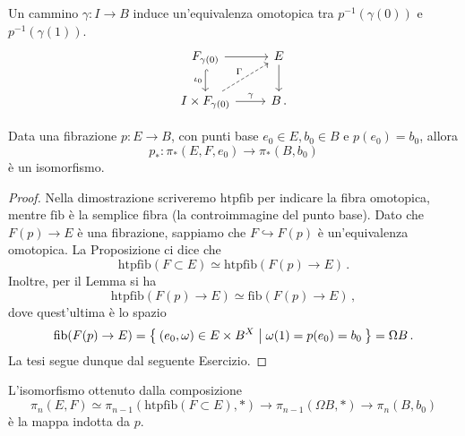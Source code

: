 \begin{exercise}
	Un cammino $\gamma : I \to B$ induce un'equivalenza omotopica
	tra $p^{-1}(\gamma(0))$ e $p^{-1}(\gamma(1))$.
	\begin{equation*}
		\begin{tikzcd}
			F_{\gamma(0)} \ar[r] \ar[d, "\iota_{0}"', hook] 
			& E \ar[d] \\
			I \times F_{\gamma(0)} \ar[r, "\gamma"] \ar[ur, "\Gamma", dashed]
			& B\,.
		\end{tikzcd}
	\end{equation*}
\end{exercise}

\begin{lemma}
	Data una fibrazione $p:E \to B$, con punti base
	$e_{0} \in E, b_{0} \in B$ e $p(e_{0}) = b_{0}$,
	allora
	\begin{equation*}
		p_{*} : \pi_{*}(E,F,e_{0}) \longrightarrow \pi_{*}(B,b_{0})
	\end{equation*}
	è un isomorfismo.
	\begin{proof}
		Nella dimostrazione scriveremo $\mathrm{htpfib}$ per indicare la fibra omotopica,
		mentre $\mathrm{fib}$ è la semplice fibra (la controimmagine del punto base).
		Dato che $F(p) \to E$ è una fibrazione,
		sappiamo che $F \hookrightarrow F(p)$
		è un'equivalenza omotopica.
		La Proposizione ci dice che
		\begin{equation*}
			\mathrm{htpfib}(F \subset E) \simeq \mathrm{htpfib}(F(p) \to E)\,.
		\end{equation*}
		Inoltre, per il Lemma si ha
		\begin{equation*}
			\mathrm{htpfib}(F(p) \to E) \simeq \mathrm{fib}(F(p) \to E)\,,
		\end{equation*}
		dove quest'ultima è lo spazio
		\begin{equation*}
			\mathrm{fib}(F(p) \to E) = 
			\Set{(e_{0},\omega) \in E \times B^{X} | \omega(1) = p(e_{0}) = b_{0}}
			= \Omega B\,.
		\end{equation*}
		La tesi segue dunque dal seguente Esercizio.
	\end{proof}
\end{lemma}

\begin{exercise}
	L'isomorfismo ottenuto dalla composizione 
	\begin{equation*}
		\pi_{n}(E,F) \simeq \pi_{n-1}(\mathrm{htpfib}(F \subset E), \ast)
		\to \pi_{n-1}(\Omega B, \ast) \to \pi_{n}(B, b_{0})
	\end{equation*}
	è la mappa indotta da $p$.
\end{exercise}

